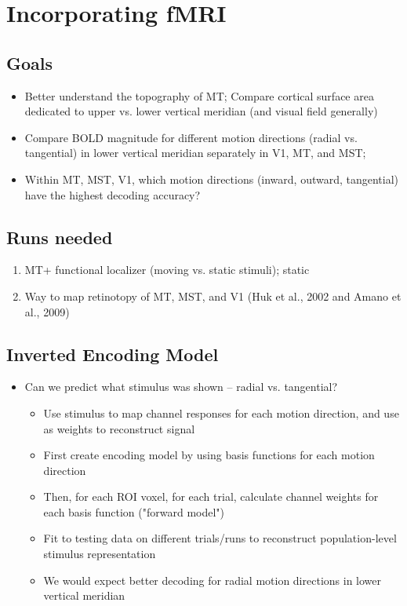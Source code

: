 \documentclass[11pt]{article} %
\begin{document}
\section{Incorporating fMRI} 
\subsection{Goals}
\begin{itemize}
	\item Better understand the topography of MT; Compare cortical surface area dedicated to upper vs. lower vertical meridian (and visual field generally)
	\item Compare BOLD magnitude for different motion directions (radial vs. tangential) in lower vertical meridian separately in V1, MT, and MST; 
	\item Within MT, MST, V1, which motion directions (inward, outward, tangential) have the highest decoding accuracy?
\end{itemize}
\subsection{Runs needed}
\begin{enumerate}
	\item MT+ functional localizer (moving vs. static stimuli); static 
	\item Way to map retinotopy of MT, MST, and V1 (Huk et al., 2002 and Amano et al., 2009)
\end{enumerate}
\subsection{Inverted Encoding Model}
	\begin{itemize}
	\item Can we predict what stimulus was shown -- radial vs. tangential?
	\begin{itemize}
		\item{Use stimulus to map channel responses for each motion direction, and use as weights to reconstruct signal }
		\item{First create encoding model by using basis functions for each motion direction}
		\item{Then, for each ROI voxel, for each trial, calculate channel weights for each basis function ("forward model")}
		\item{Fit to testing data on different trials/runs to reconstruct population-level stimulus representation}
		\item{We would expect better decoding for radial motion directions in lower vertical meridian}
	\end{itemize}
\end{itemize}
\end{document}
